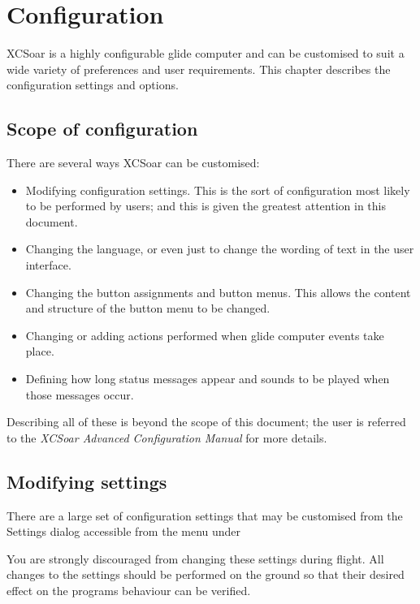 \chapter{Configuration}\label{cha:configuration}
XCSoar is a highly configurable glide computer and can be customised
to suit a wide variety of preferences and user requirements.  This
chapter describes the configuration settings and options.

\section{Scope of configuration}

There are several ways XCSoar can be customised:
\begin{itemize}

\item Modifying configuration settings.  This is the sort of configuration
 most likely to be performed by users; and this is given the greatest attention in this document.
\item Changing the language, or even just to change the wording
  of text in the user interface.
\item Changing the button assignments and button menus.  This allows 
the content and structure of the button menu to be changed. 
\item Changing or adding actions performed when glide computer events
 take place.
\item Defining how long status messages appear and sounds to be played
 when those messages occur.
\end{itemize}
Describing all of these is beyond the scope of this document;
the user is referred to the {\em XCSoar Advanced Configuration Manual} 
for more details.  

\section{Modifying settings}

There are a large set of configuration settings that may be customised
from the Settings dialog accessible from the menu under
\begin{quote}
\blink{}\blink{}
\end{quote}

You are strongly discouraged from changing these settings during
flight.  \warning  All changes to the settings should be performed on the ground
so that their desired effect on the programs behaviour can be
verified.

